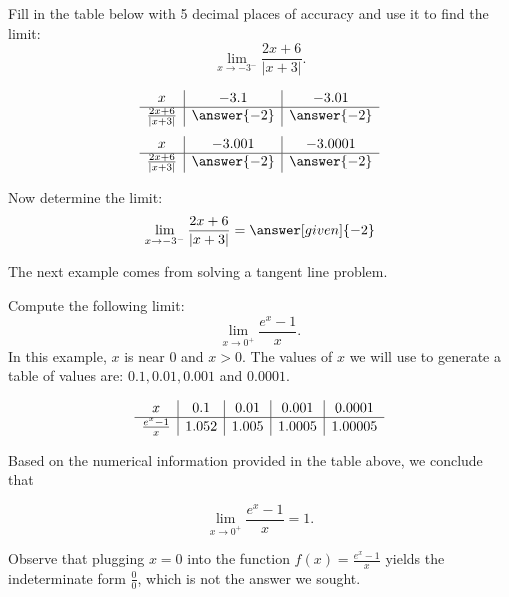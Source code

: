 \documentclass{ximera}
\begin{document}
\begin{problem}[problem 3]
Fill in the table below with 5 decimal places of accuracy and use it to find the limit:
\[\lim_{x \to -3^-} \frac{2x+6}{|x+3|}.\]

\begin{prompt}
\begin{center}
\[
\begin{array}{ c | c | c }
  x & -3.1 & -3.01   \\ 
	\hline 
	 \frac{2x+6}{|x+3|} & \answer{-2} & \answer{-2} 
\end{array}
\]
\[
\begin{array}{ c | c | c  }
  x  & -3.001 & -3.0001 \\ 
	\hline 
	 \frac{2x+6}{|x+3|}  & \answer{-2} & \answer{-2}
\end{array}
\]
\end{center}
Now determine the limit:
\[
\lim_{x \to -3^-} \frac{2x+6}{|x+3|} = \answer[given]{-2}
\]
\end{prompt}
\end{problem}


The next example comes from solving a tangent line problem.



\begin{example}[example 4]
Compute the following limit:
\[\lim_{x \to 0^{+}} \frac{e^x-1}{x}.\]
In this example, $x$ is near $0$ and $x>0$.  The values of $x$ we will use to 
generate a table of values are: $0.1, 0.01, 0.001$ and $0.0001.$

\[
\begin{array}{ c | c | c | c | c }
  x & 0.1 & 0.01  & 0.001 & 0.0001 \\ 
	\hline
	 \frac{e^x - 1}{x} & 1.052 & 1.005 & 1.0005 & 1.00005
\end{array}
\]

Based on the numerical information provided in the table above, we conclude that 

\[\lim_{x \to 0^+} \frac{e^x - 1}{x} = 1.\]


Observe that plugging $x=0$ into the 
function $\displaystyle{f(x)= \frac{e^x -1}{x}}$ yields the indeterminate form $\frac{0}{0}$, which is not
the answer we sought.

\end{example}
\end{document}

